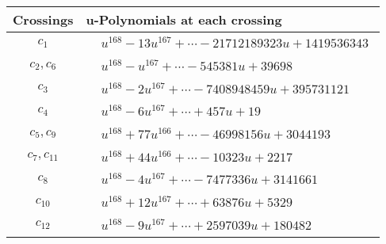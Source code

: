 \documentclass[1p]{elsarticle_modified}
\theoremstyle{definition}
\begin{document}
\begin{tabular}{m{50pt}|m{274pt}}
Crossings & \hspace{64pt}u-Polynomials at each crossing \\
\hline $$\begin{aligned}c_{1}\end{aligned}$$&$\begin{aligned}
&u^{168}-13 u^{167}+\cdots-21712189323 u+1419536343
\end{aligned}$\\
\hline $$\begin{aligned}c_{2},c_{6}\end{aligned}$$&$\begin{aligned}
&u^{168}- u^{167}+\cdots-545381 u+39698
\end{aligned}$\\
\hline $$\begin{aligned}c_{3}\end{aligned}$$&$\begin{aligned}
&u^{168}-2 u^{167}+\cdots-7408948459 u+395731121
\end{aligned}$\\
\hline $$\begin{aligned}c_{4}\end{aligned}$$&$\begin{aligned}
&u^{168}-6 u^{167}+\cdots+457 u+19
\end{aligned}$\\
\hline $$\begin{aligned}c_{5},c_{9}\end{aligned}$$&$\begin{aligned}
&u^{168}+77 u^{166}+\cdots-46998156 u+3044193
\end{aligned}$\\
\hline $$\begin{aligned}c_{7},c_{11}\end{aligned}$$&$\begin{aligned}
&u^{168}+44 u^{166}+\cdots-10323 u+2217
\end{aligned}$\\
\hline $$\begin{aligned}c_{8}\end{aligned}$$&$\begin{aligned}
&u^{168}-4 u^{167}+\cdots-7477336 u+3141661
\end{aligned}$\\
\hline $$\begin{aligned}c_{10}\end{aligned}$$&$\begin{aligned}
&u^{168}+12 u^{167}+\cdots+63876 u+5329
\end{aligned}$\\
\hline $$\begin{aligned}c_{12}\end{aligned}$$&$\begin{aligned}
&u^{168}-9 u^{167}+\cdots+2597039 u+180482
\end{aligned}$\\
\hline
\end{tabular}\\~\\
\end{document}
